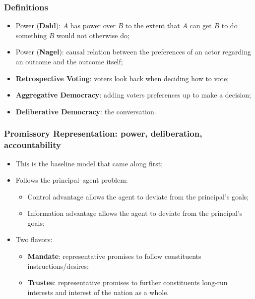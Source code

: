 \documentclass[aspectratio=169]{beamer}
\theoremstyle{principle}
\begin{document}
\begin{frame}
\frametitle{Definitions}
\begin{itemize}
\item Power (\textbf{Dahl}): $A$ has power over $B$ to the extent that $A$ can get $B$ to do something $B$ would not otherwise do;
\bigskip
\bigskip
\item Power (\textbf{Nagel}): causal relation between the preferences of an actor regarding an outcome and the outcome itself;
\bigskip
\bigskip
\item \textbf{Retrospective Voting}: voters look back when deciding how to vote;
\bigskip
\bigskip
\item \textbf{Aggregative Democracy}: adding voters preferences up to make a decision;
\bigskip
\bigskip
\item \textbf{Deliberative Democracy}: the conversation.


\end{itemize}
\end{frame}



\begin{frame}
\frametitle{Promissory Representation: power, deliberation, accountability}
\begin{itemize}
\item This is the baseline model that came along first;
\bigskip
\bigskip
\item Follows the principal--agent problem:
\begin{itemize}
\item Control advantage allows the agent to deviate from the principal's goals;
\item Information advantage allows the agent to deviate from the principal's goals;
\end{itemize}
\bigskip
\bigskip
\item Two flavors:
\begin{itemize}
\item \textbf{Mandate}: representative promises to follow constituents instructions/desires;
\item \textbf{Trustee}: representative promises to further constituents long-run interests and interest of the nation as a whole.
\end{itemize}
\end{itemize}

\end{frame}
\end{document}
